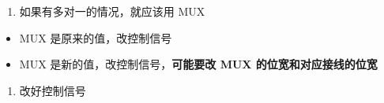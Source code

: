 \documentclass[12pt,AutoFakeBold,AutoFakeSlant]{article}
\providecommand{\tightlist}{%
  \setlength{\itemsep}{0pt}\setlength{\parskip}{0pt}}
\begin{document}
\begin{enumerate}
\def\labelenumi{\arabic{enumi}.}
\setcounter{enumi}{1}
\tightlist
\item
  如果有多对一的情况，就应该用 MUX
\end{enumerate}

\begin{itemize}
\tightlist
\item
  MUX 是原来的值，改控制信号
\item
  MUX 是新的值，改控制信号，\textbf{可能要改 MUX 的位宽和对应接线的位宽}
\end{itemize}

\begin{enumerate}
\def\labelenumi{\arabic{enumi}.}
\setcounter{enumi}{2}
\tightlist
\item
  改好控制信号
\end{enumerate}
\end{document}
